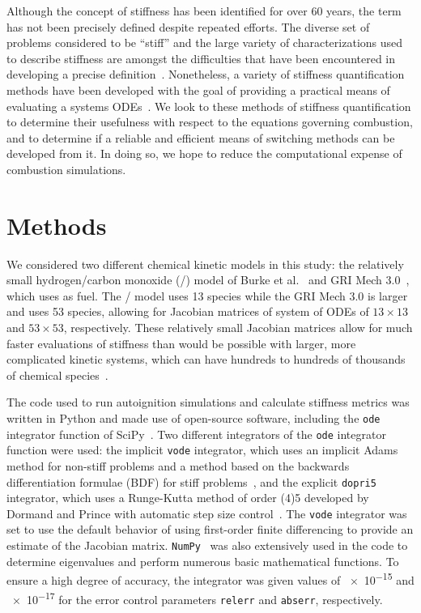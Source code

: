 \documentclass[12pt]{ussci}
\begin{document}
Although the concept of stiffness has been identified for over 60 years, the term has not been precisely defined despite repeated efforts.
The diverse set of problems considered to be ``stiff'' and the large variety of characterizations used to describe stiffness are amongst the difficulties that have been encountered in developing a precise definition~\cite{Soderlind2014}.
Nonetheless, a variety of stiffness quantification methods have been developed with the goal of providing a practical means of evaluating a systems ODEs~\cite{Soderlind2014,Shampine1985,Brugnano2011,Lambert1973ComputationalEquations,Hairer1996SolvingII}.
We look to these methods of stiffness quantification to determine their usefulness with respect to the equations governing combustion, and to determine if a reliable and efficient means of switching methods can be developed from it.
In doing so, we hope to reduce the computational expense of combustion simulations.

\section{Methods}
We considered two different chemical kinetic models in this study: the relatively small hydrogen\slash carbon monoxide (\slash {}) model of Burke et al.~\cite{Burke:2011fh} and GRI Mech 3.0~\cite{grimech3}, which uses  as fuel.
The \slash {} model uses 13 species while the GRI Mech 3.0 is larger and uses 53 species, allowing for Jacobian matrices of system of ODEs of $13 \times 13$ and $53 \times 53$, respectively.
These relatively small Jacobian matrices allow for much faster evaluations of stiffness than would be possible with larger, more complicated kinetic systems, which can have hundreds to hundreds of thousands of chemical species~\cite{Niemeyer:2013}.

The code used to run autoignition simulations and calculate stiffness metrics was written in Python and made use of open-source software, including the \texttt{ode} integrator function of SciPy~\cite{SciPy}.
Two different integrators of the \texttt{ode} integrator function were used: the implicit \texttt{vode} integrator, which uses an implicit Adams method for non-stiff problems and a method based on the backwards differentiation formulae (BDF) for stiff problems~\cite{Brown1989}, and the explicit \texttt{dopri5} integrator, which uses a Runge-Kutta method of order (4)5 developed by Dormand and Prince with automatic step size control~\cite{E.HairerSPNorsett1990}.
The \texttt{vode} integrator was set to use the default behavior of using first-order finite differencing to provide an estimate of the Jacobian matrix.
\texttt{NumPy}~\cite{VanDerWalt2011} was also extensively used in the code to determine eigenvalues and perform numerous basic mathematical functions.
To ensure a high degree of accuracy, the integrator was given values of \num{e-15} and \num{e-17} for the error control parameters \texttt{relerr} and \texttt{abserr}, respectively.
\end{document}
